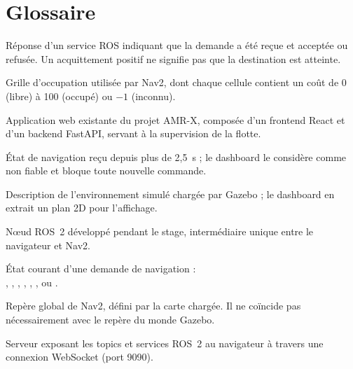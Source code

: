 \chapter*{Glossaire}
\begin{description}[style=nextline,leftmargin=4.8cm,labelwidth=4.5cm,font=\bfseries]
  \item[Acquittement] Réponse d'un service ROS indiquant que la demande a été reçue et
    acceptée ou refusée. Un acquittement positif ne signifie pas que la destination est
    atteinte.
  \item[Costmap] Grille d'occupation utilisée par Nav2, dont chaque cellule contient un
    coût de 0 (libre) à 100 (occupé) ou $-1$ (inconnu).
  \item[Dashboard] Application web existante du projet AMR-X, composée d'un frontend React
    et d'un backend FastAPI, servant à la supervision de la flotte.
  \item[Donnée périmée] État de navigation reçu depuis plus de 2,5~s ; le dashboard
    le considère comme non fiable et bloque toute nouvelle commande.
  \item[Monde SDF] Description de l'environnement simulé chargée par Gazebo ; le dashboard
    en extrait un plan 2D pour l'affichage.
  \item[Passerelle] Nœud ROS~2  développé pendant le stage,
    intermédiaire unique entre le navigateur et Nav2.
  \item[Phase] État courant d'une demande de navigation :\\ , ,
    , , ,
    ,  ou .
  \item[Repère \code{map}] Repère global de Nav2, défini par la carte chargée. Il ne coïncide
    pas nécessairement avec le repère du monde Gazebo.
  \item[rosbridge] Serveur exposant les topics et services ROS~2 au navigateur à travers
    une connexion WebSocket (port 9090).
\end{description}
